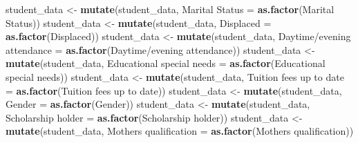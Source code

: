 \documentclass[
]{article}
\newenvironment{Shaded}{\begin{snugshade}}{\end{snugshade}}
\newcommand{\AttributeTok}[1]{\textcolor[rgb]{0.13,0.29,0.53}{#1}}
\newcommand{\FunctionTok}[1]{\textcolor[rgb]{0.13,0.29,0.53}{\textbf{#1}}}
\newcommand{\NormalTok}[1]{#1}
\newcommand{\OtherTok}[1]{\textcolor[rgb]{0.56,0.35,0.01}{#1}}
\newcommand{\StringTok}[1]{\textcolor[rgb]{0.31,0.60,0.02}{#1}}
\begin{document}
\begin{Shaded}
\begin{Highlighting}[]
\NormalTok{student\_data }\OtherTok{\textless{}{-}} \FunctionTok{mutate}\NormalTok{(student\_data, }\StringTok{\textasciigrave{}}\AttributeTok{Marital Status}\StringTok{\textasciigrave{}} \OtherTok{=} \FunctionTok{as.factor}\NormalTok{(}\StringTok{\textasciigrave{}}\AttributeTok{Marital Status}\StringTok{\textasciigrave{}}\NormalTok{))}
\NormalTok{student\_data }\OtherTok{\textless{}{-}} \FunctionTok{mutate}\NormalTok{(student\_data, }\StringTok{\textasciigrave{}}\AttributeTok{Displaced}\StringTok{\textasciigrave{}} \OtherTok{=} \FunctionTok{as.factor}\NormalTok{(}\StringTok{\textasciigrave{}}\AttributeTok{Displaced}\StringTok{\textasciigrave{}}\NormalTok{))}
\NormalTok{student\_data }\OtherTok{\textless{}{-}} \FunctionTok{mutate}\NormalTok{(student\_data, }\StringTok{\textasciigrave{}}\AttributeTok{Daytime/evening attendance}\StringTok{\textasciigrave{}} \OtherTok{=} \FunctionTok{as.factor}\NormalTok{(}\StringTok{\textasciigrave{}}\AttributeTok{Daytime/evening attendance}\StringTok{\textasciigrave{}}\NormalTok{))}
\NormalTok{student\_data }\OtherTok{\textless{}{-}} \FunctionTok{mutate}\NormalTok{(student\_data, }\StringTok{\textasciigrave{}}\AttributeTok{Educational special needs}\StringTok{\textasciigrave{}} \OtherTok{=} \FunctionTok{as.factor}\NormalTok{(}\StringTok{\textasciigrave{}}\AttributeTok{Educational special needs}\StringTok{\textasciigrave{}}\NormalTok{))}
\NormalTok{student\_data }\OtherTok{\textless{}{-}} \FunctionTok{mutate}\NormalTok{(student\_data, }\StringTok{\textasciigrave{}}\AttributeTok{Tuition fees up to date}\StringTok{\textasciigrave{}} \OtherTok{=} \FunctionTok{as.factor}\NormalTok{(}\StringTok{\textasciigrave{}}\AttributeTok{Tuition fees up to date}\StringTok{\textasciigrave{}}\NormalTok{))}
\NormalTok{student\_data }\OtherTok{\textless{}{-}} \FunctionTok{mutate}\NormalTok{(student\_data, }\StringTok{\textasciigrave{}}\AttributeTok{Gender}\StringTok{\textasciigrave{}} \OtherTok{=} \FunctionTok{as.factor}\NormalTok{(}\StringTok{\textasciigrave{}}\AttributeTok{Gender}\StringTok{\textasciigrave{}}\NormalTok{))}
\NormalTok{student\_data }\OtherTok{\textless{}{-}} \FunctionTok{mutate}\NormalTok{(student\_data, }\StringTok{\textasciigrave{}}\AttributeTok{Scholarship holder}\StringTok{\textasciigrave{}} \OtherTok{=} \FunctionTok{as.factor}\NormalTok{(}\StringTok{\textasciigrave{}}\AttributeTok{Scholarship holder}\StringTok{\textasciigrave{}}\NormalTok{))}
\NormalTok{student\_data }\OtherTok{\textless{}{-}} \FunctionTok{mutate}\NormalTok{(student\_data, }\StringTok{\textasciigrave{}}\AttributeTok{Mother\textquotesingle{}s qualification}\StringTok{\textasciigrave{}} \OtherTok{=} \FunctionTok{as.factor}\NormalTok{(}\StringTok{\textasciigrave{}}\AttributeTok{Mother\textquotesingle{}s qualification}\StringTok{\textasciigrave{}}\NormalTok{))}

\end{Highlighting}
\end{Shaded}
\end{document}
